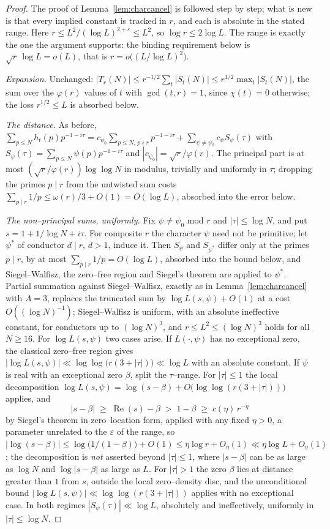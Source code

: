 \documentclass[11pt]{article}
\theoremstyle{definition}
\begin{document}
\begin{proof}
The proof of Lemma~\ref{lem:charcancel} is followed step by step; what is new is that every
implied constant is tracked in $r$, and each is absolute in the stated range. Here
$r\le L^2/(\log L)^{2+\varepsilon}\le L^2$, so $\log r\le2\log L$. The range is exactly the one
the argument supports: the binding requirement below is $\sqrt r\,\log L=o(L)$, that is
$r=o\bigl((L/\log L)^2\bigr)$.

\emph{Expansion.} Unchanged: $|T_r(N)|\le r^{-1/2}\sum_{t}|S_t(N)|\le r^{1/2}\max_t|S_t(N)|$,
the sum over the $\varphi(r)$ values of $t$ with $\gcd(t,r)=1$, since $\chi(t)=0$ otherwise; the
loss $r^{1/2}\le L$ is absorbed below.

\emph{The distance.} As before,
$\sum_{p\le N}h_t(p)p^{-1-i\tau}=c_{\psi_0}\sum_{p\le N,\,p\nmid r}p^{-1-i\tau}
+\sum_{\psi\ne\psi_0}c_\psi S_\psi(\tau)$ with $S_\psi(\tau)=\sum_{p\le N}\psi(p)p^{-1-i\tau}$
and $|c_{\psi_0}|=\sqrt r/\varphi(r)$. The principal part is at most
$(\sqrt r/\varphi(r))\log\log N$ in modulus, trivially and uniformly in $\tau$; dropping the
primes $p\mid r$ from the untwisted sum costs $\sum_{p\mid r}1/p\le\omega(r)/3+O(1)=O(\log L)$,
absorbed into the error below.

\emph{The non--principal sums, uniformly.} Fix $\psi\ne\psi_0$ mod $r$ and $|\tau|\le\log N$, and
put $s=1+1/\log N+i\tau$. For composite $r$ the character $\psi$ need not be primitive; let
$\psi^{*}$ of conductor $d\mid r$, $d>1$, induce it. Then $S_\psi$ and $S_{\psi^{*}}$ differ only at
the primes $p\mid r$, by at most $\sum_{p\mid r}1/p=O(\log L)$, absorbed into the bound below, and
Siegel--Walfisz, the zero--free region and Siegel's theorem are applied to $\psi^{*}$. Partial summation against Siegel--Walfisz, exactly as in
Lemma~\ref{lem:charcancel} with $A=3$, replaces the truncated sum by
$\log L(s,\psi)+O(1)$ at a cost $O((\log N)^{-1})$; Siegel--Walfisz is uniform, with an absolute
ineffective constant, for conductors up to $(\log N)^{3}$, and $r\le L^{2}\le(\log N)^{3}$ holds
for all $N\ge16$. For $\log L(s,\psi)$ two cases arise. If $L(\cdot,\psi)$ has no exceptional
zero, the classical zero--free region gives
$|\log L(s,\psi)|\ll\log\log\bigl(r(3+|\tau|)\bigr)\ll\log L$ with an absolute constant. If
$\psi$ is real with an exceptional zero $\beta$, split the $\tau$--range. For $|\tau|\le1$ the local
decomposition $\log L(s,\psi)=\log(s-\beta)+O\bigl(\log\log(r(3+|\tau|))\bigr)$ applies, and
\[ |s-\beta|\;\ge\;\operatorname{Re}(s)-\beta\;>\;1-\beta\;\ge\;c(\eta)\,r^{-\eta} \]
by Siegel's theorem in zero--location form, applied with any fixed $\eta>0$, a parameter
unrelated to the $\varepsilon$ of the range, so
$|\log(s-\beta)|\le\log\bigl(1/(1-\beta)\bigr)+O(1)\le\eta\log r+O_\eta(1)
\ll\eta\log L+O_\eta(1)$; the decomposition is \emph{not} asserted beyond $|\tau|\le1$,
where $|s-\beta|$ can be as large as $\log N$ and $\log|s-\beta|$ as large as $L$. For $|\tau|>1$
the zero $\beta$ lies at distance greater than $1$ from $s$, outside the local zero--density disc,
and the unconditional bound $|\log L(s,\psi)|\ll\log\log(r(3+|\tau|))$ applies with no exceptional
case. In both regimes $|S_\psi(\tau)|\ll\log L$, absolutely and ineffectively, uniformly in
$|\tau|\le\log N$.


\end{proof}
\end{document}
